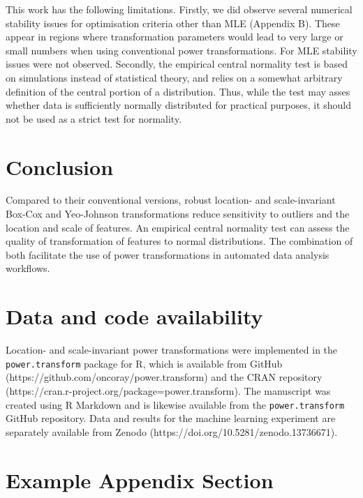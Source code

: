 \documentclass[preprint,12pt,authoryear]{elsarticle}
\begin{document}
This work has the following limitations. Firstly, we did observe several
numerical stability issues for optimisation criteria other than MLE
(Appendix B). These appear in regions where transformation parameters
would lead to very large or small numbers when using conventional power
transformations. For MLE stability issues were not observed. Secondly,
the empirical central normality test is based on simulations instead of
statistical theory, and relies on a somewhat arbitrary definition of the
central portion of a distribution. Thus, while the test may asses
whether data is sufficiently normally distributed for practical
purposes, it should not be used as a strict test for normality.

\section{Conclusion}\label{conclusion}

Compared to their conventional versions, robust location- and
scale-invariant Box-Cox and Yeo-Johnson transformations reduce
sensitivity to outliers and the location and scale of features. An
empirical central normality test can assess the quality of
transformation of features to normal distributions. The combination of
both facilitate the use of power transformations in automated data
analysis workflows.

\section{Data and code availability}\label{data-and-code-availability}

Location- and scale-invariant power transformations were implemented in
the \texttt{power.transform} package for R, which is available from
GitHub (https://github.com/oncoray/power.transform) and the CRAN
repository (https://cran.r-project.org/package=power.transform).
The manuscript was created using R Markdown and is likewise
available from the \texttt{power.transform} GitHub repository. Data and
results for the machine learning experiment are separately available
from Zenodo (https://doi.org/10.5281/zenodo.13736671).


\appendix
\section{Example Appendix Section}
\label{app1}
\end{document}
